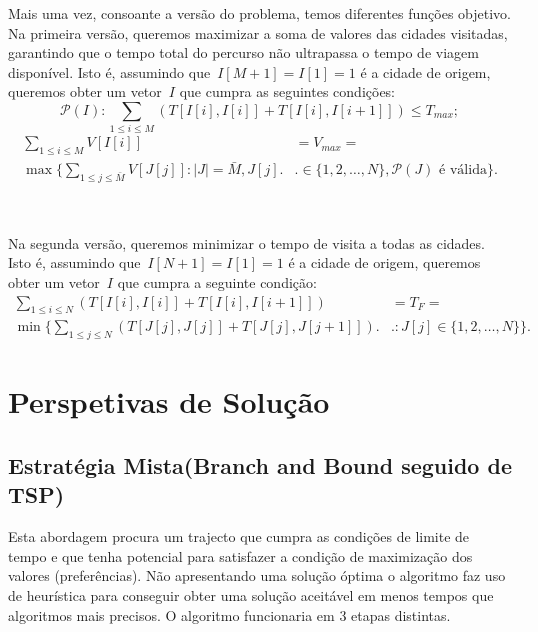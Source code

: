 \documentclass[12pt,a4paper,reqno]{report}
\numberwithin{figure}{section}
\numberwithin{equation}{section}
\begin{document}
Mais uma vez, consoante a versão do problema, temos diferentes funções objetivo. Na primeira versão, queremos maximizar a soma de valores das cidades visitadas, garantindo que o tempo total do percurso não ultrapassa o tempo de viagem disponível. Isto é, assumindo que~$I[M+1] = I[1] = 1$ é a cidade de origem, queremos obter um vetor~$I$ que cumpra as seguintes condições:
\begin{equation}
		\mathscr{P}(I): \sum_{1 \leq i \leq M} (T[I[i],I[i]] + T[I[i],I[i+1]]) \leq T_{max};
\end{equation}
\begin{equation}
	\begin{split}
		\sum_{1 \leq i \leq M} V[I[i]] & = V_{max} = \\
		\max \Bigg\{\sum_{1 \leq j \leq \bar{M}} V[J[j]] : |J| = \bar{M}, J[j] \Bigg. & \Bigg. \in \{1, 2, \ldots, N\}, \mathscr{P}(J) \text{ é válida}\Bigg\}.
	\end{split}
\end{equation}

\
\
\

Na segunda versão, queremos minimizar o tempo de visita a todas as cidades. Isto é, assumindo que~$I[N+1] = I[1] = 1$ é a cidade de origem, queremos obter um vetor~$I$ que cumpra a seguinte condição:
\begin{equation}
	\begin{align*}
		\sum_{1 \leq i \leq N} (T[I[i],I[i]] + T[I[i],I[i+1]]) & = T_F = \\
		\min \Bigg\{\sum_{1 \leq j \leq N} (T[J[j],J[j]] + T[J[j],J[j+1]]) \Bigg. & \Bigg. : J[j] \in \{1, 2, \ldots, N\}\Bigg\}.
	\end{align*}
\end{equation}

\chapter{Perspetivas de Solução}

\section{Estratégia Mista(Branch and Bound seguido de TSP)}
Esta abordagem procura um trajecto que cumpra as condições de limite de tempo e que tenha potencial para satisfazer a condição de maximização dos valores (preferências). Não apresentando uma solução óptima o algoritmo faz uso de heurística para conseguir obter uma solução aceitável em menos tempos que algoritmos mais precisos.
O algoritmo funcionaria em 3 etapas distintas.
\end{document}
